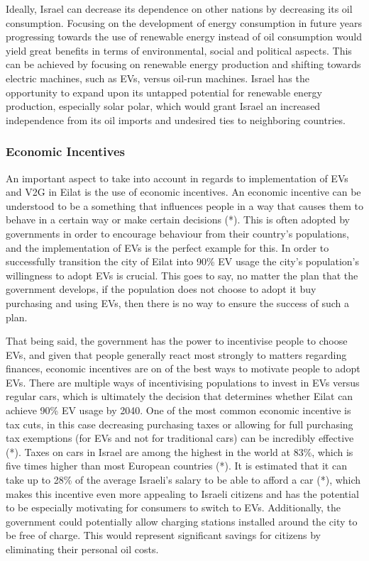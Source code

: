 \documentclass{article}                         %
\begin{document}
Ideally, Israel can decrease its dependence on other nations by decreasing its oil consumption. Focusing on the development of energy consumption in future years progressing towards the use of renewable energy instead of oil consumption would yield great benefits in terms of environmental, social and political aspects. This can be achieved by focusing on renewable energy production and shifting towards electric machines, such as EVs, versus oil-run machines. Israel has the opportunity to expand upon its untapped potential for renewable energy production, especially solar polar, which would grant Israel an increased independence from its oil imports and undesired ties to neighboring countries.

\subsubsection{Economic Incentives}
An important aspect to take into account in regards to implementation of EVs and V2G in Eilat is the use of economic incentives. An economic incentive can be understood to be a something that influences people in a way that causes them to behave in a certain way or make certain decisions (*). This is often adopted by governments in order to encourage behaviour from their country’s populations, and the implementation of EVs is the perfect example for this. In order to successfully transition the city of Eilat into 90\% EV usage the city’s population’s willingness to adopt EVs is crucial. This goes to say, no matter the plan that the government develops, if the population does not choose to adopt it buy purchasing and using EVs, then there is no way to ensure the success of such a plan. 

That being said, the government has the power to incentivise people to choose EVs, and given that people generally react most strongly to matters regarding finances, economic incentives are on of the best ways to motivate people to adopt EVs. There are multiple ways of incentivising populations to invest in EVs versus regular cars, which is ultimately the decision that determines whether Eilat can achieve 90\% EV usage by 2040. One of the most common economic incentive is tax cuts, in this case decreasing purchasing taxes or allowing for full purchasing tax exemptions (for EVs and not for traditional cars) can be incredibly effective (*). Taxes on cars in Israel are among the highest in the world at 83\%, which is five times higher than most European countries (*). It is estimated that it can take up to 28\% of the average Israeli’s salary to be able to afford a car (*), which makes this incentive even more appealing to Israeli citizens and has the potential to be especially motivating for consumers to switch to EVs. Additionally, the government could potentially allow charging stations installed around the city to be free of charge. This would represent significant savings for citizens by eliminating their personal oil costs. 
\end{document}

